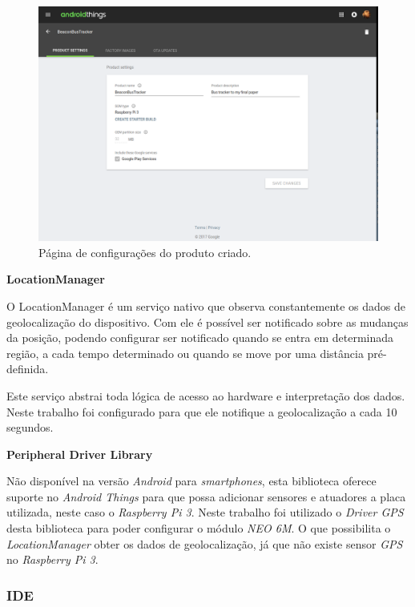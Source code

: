 \documentclass[
	12pt,				%
	oneside,			%
	a4paper,			%
	brazil				%
]{abntex2}
\begin{document}
{\begin{figure}[H]
\centering
\includegraphics[width=15cm, center]{images/android-things-console-settings}
\caption{Página de configurações do produto criado.}
\label{Rotulo}
\end{figure}

\textbf{LocationManager}

O LocationManager é um serviço nativo que observa constantemente os dados de geolocalização do dispositivo. Com ele é possível ser notificado sobre as mudanças da posição, podendo configurar ser notificado quando se entra em determinada região, a cada tempo determinado ou quando se move por uma distância pré-definida. 

Este serviço abstrai toda lógica de acesso ao hardware e interpretação dos dados. Neste trabalho foi configurado para que ele notifique a geolocalização a cada 10 segundos.

\textbf{Peripheral Driver Library}

Não disponível na versão \textit{Android} para \textit{smartphones}, esta biblioteca oferece suporte no \textit{Android Things} para que possa adicionar sensores e atuadores a placa utilizada, neste caso o \textit{Raspberry Pi 3}. Neste trabalho foi utilizado o \textit{Driver GPS} desta biblioteca para poder configurar o módulo \textit{NEO 6M}. O que possibilita o \textit{LocationManager} obter os dados de geolocalização, já que não existe sensor \textit{GPS} no \textit{Raspberry Pi 3}.

\subsubsection{IDE}

}
\end{document}
